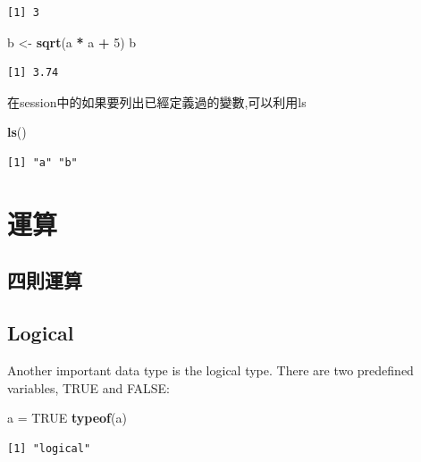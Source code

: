 \documentclass[]{book}
\newenvironment{Shaded}{\begin{snugshade}}{\end{snugshade}}
\newcommand{\DecValTok}[1]{\textcolor[rgb]{0.00,0.00,0.81}{#1}}
\newcommand{\KeywordTok}[1]{\textcolor[rgb]{0.13,0.29,0.53}{\textbf{#1}}}
\newcommand{\NormalTok}[1]{#1}
\newcommand{\OperatorTok}[1]{\textcolor[rgb]{0.81,0.36,0.00}{\textbf{#1}}}
\newcommand{\OtherTok}[1]{\textcolor[rgb]{0.56,0.35,0.01}{#1}}
\newcommand{\StringTok}[1]{\textcolor[rgb]{0.31,0.60,0.02}{#1}}
\theoremstyle{definition}
\theoremstyle{definition}
\theoremstyle{definition}
\theoremstyle{remark}
\begin{document}
\begin{verbatim}
[1] 3
\end{verbatim}

\begin{Shaded}
\begin{Highlighting}[]
\NormalTok{b <-}\StringTok{ }\KeywordTok{sqrt}\NormalTok{(a }\OperatorTok{*}\StringTok{ }\NormalTok{a }\OperatorTok{+}\StringTok{ }\DecValTok{5}\NormalTok{)}
\NormalTok{b}
\end{Highlighting}
\end{Shaded}

\begin{verbatim}
[1] 3.74
\end{verbatim}

在session中的如果要列出已經定義過的變數,可以利用ls

\begin{Shaded}
\begin{Highlighting}[]
\KeywordTok{ls}\NormalTok{()}
\end{Highlighting}
\end{Shaded}

\begin{verbatim}
[1] "a" "b"
\end{verbatim}

\section{運算}

\subsection{四則運算}

\hypertarget{logical}{%
\subsection{Logical}\label{logical}}

Another important data type is the logical type. There are two
predefined variables, TRUE and FALSE:

\begin{Shaded}
\begin{Highlighting}[]
\NormalTok{a =}\StringTok{ }\OtherTok{TRUE}
\KeywordTok{typeof}\NormalTok{(a)}
\end{Highlighting}
\end{Shaded}

\begin{verbatim}
[1] "logical"
\end{verbatim}
\end{document}
